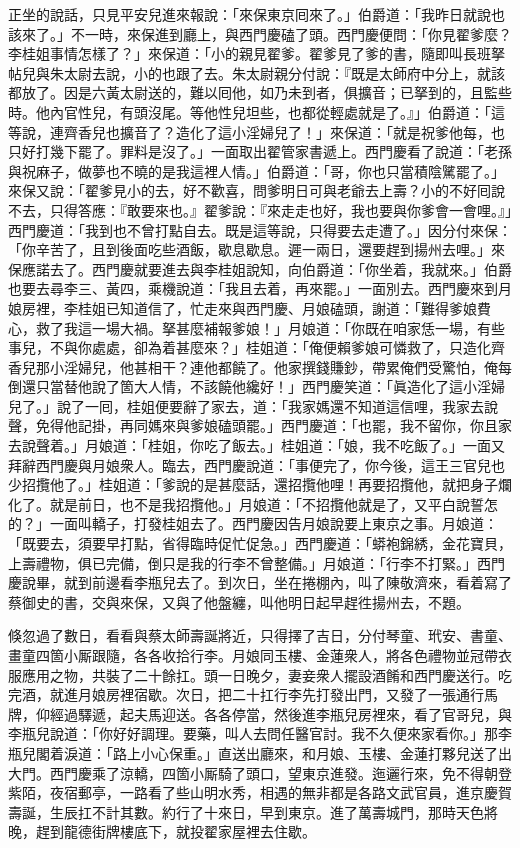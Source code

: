 正坐的說話，只見平安兒進來報說：「來保東京囘來了。」伯爵道：「我昨日就說也該來了。」不一時，來保進到廳上，與西門慶磕了頭。西門慶便問：「你見翟爹麼？李桂姐事情怎樣了？」來保道：「小的親見翟爹。翟爹見了爹的書，隨即叫長班拏帖兒與朱太尉去說，小的也跟了去。朱太尉親分付說：『既是太師府中分上，就該都放了。因是六黃太尉送的，難以囘他，如乃未到者，俱擴音；已拏到的，且監些時。他內官性兒，有頭沒尾。等他性兒坦些，也都從輕處就是了。』」伯爵道：「這等說，連齊香兒也擴音了？造化了這小淫婦兒了！」來保道：「就是祝爹他每，也只好打幾下罷了。罪料是沒了。」一面取出翟管家書遞上。西門慶看了說道：「老孫與祝麻子，做夢也不曉的是我這裡人情。」伯爵道：「哥，你也只當積陰騭罷了。」來保又說：「翟爹見小的去，好不歡喜，問爹明日可與老爺去上壽？小的不好囘說不去，只得答應：『敢要來也。』翟爹說：『來走走也好，我也要與你爹會一會哩。』」西門慶道：「我到也不曾打點自去。既是這等說，只得要去走遭了。」因分付來保：「你辛苦了，且到後面吃些酒飯，歇息歇息。遲一兩日，還要趕到揚州去哩。」來保應諾去了。西門慶就要進去與李桂姐說知，向伯爵道：「你坐着，我就來。」伯爵也要去尋李三、黃四，乘機說道：「我且去着，再來罷。」一面別去。西門慶來到月娘房裡，李桂姐已知道信了，忙走來與西門慶、月娘磕頭，謝道：「難得爹娘費心，救了我這一場大禍。拏甚麼補報爹娘！」{}月娘道：「你既在咱家恁一場，有些事兒，不與你處處，卻為着甚麼來？」桂姐道：「俺便賴爹娘可憐救了，只造化齊香兒那小淫婦兒，他甚相干？連他都饒了。他家撰錢賺鈔，帶累俺們受驚怕，俺每倒還只當替他說了箇大人情，不該饒他纔好！」{}西門慶笑道：「眞造化了這小淫婦兒了。」說了一囘，桂姐便要辭了家去，道：「我家媽還不知道這信哩，我家去說聲，免得他記掛，再同媽來與爹娘磕頭罷。」西門慶道：「也罷，我不留你，你且家去說聲着。」月娘道：「桂姐，你吃了飯去。」桂姐道：「娘，我不吃飯了。」一面又拜辭西門慶與月娘衆人。臨去，西門慶說道：「事便完了，你今後，這王三官兒也少招攬他了。」{}{}桂姐道：「爹說的是甚麼話，還招攬他哩！再要招攬他，就把身子爛化了。就是前日，也不是我招攬他。」{}月娘道：「不招攬他就是了，又平白說誓怎的？」一面叫轎子，打發桂姐去了。西門慶因告月娘說要上東京之事。月娘道：「既要去，須要早打點，省得臨時促忙促急。」西門慶道：「蟒袍錦綉，金花寶貝，上壽禮物，俱已完備，倒只是我的行李不曾整備。」月娘道：「行李不打緊。」西門慶說畢，就到前邊看李瓶兒去了。到次日，坐在捲棚內，叫了陳敬濟來，看着寫了蔡御史的書，交與來保，又與了他盤纏，叫他明日起早趕徃揚州去，不題。

倏忽過了數日，看看與蔡太師壽誕將近，只得擇了吉日，分付琴童、玳安、書童、畫童四箇小厮跟隨，各各收拾行李。月娘同玉樓、金蓮衆人，將各色禮物並冠帶衣服應用之物，共裝了二十餘扛。頭一日晚夕，妻妾衆人擺設酒餚和西門慶送行。吃完酒，就進月娘房裡宿歇。次日，把二十扛行李先打發出門，又發了一張通行馬牌，仰經過驛遞，起夫馬迎送。各各停當，然後進李瓶兒房裡來，看了官哥兒，與李瓶兒說道：「你好好調理。要藥，叫人去問任醫官討。我不久便來家看你。」那李瓶兒閣着淚道：「路上小心保重。」直送出廳來，和月娘、玉樓、金蓮打夥兒送了出大門。西門慶乘了涼轎，四箇小厮騎了頭口，望東京進發。迤邐行來，免不得朝登紫陌，夜宿郵亭，{}一路看了些山明水秀，相遇的無非都是各路文武官員，進京慶賀壽誕，生辰扛不計其數。約行了十來日，早到東京。進了萬壽城門，那時天色將晚，趕到龍德街牌樓底下，就投翟家屋裡去住歇。


